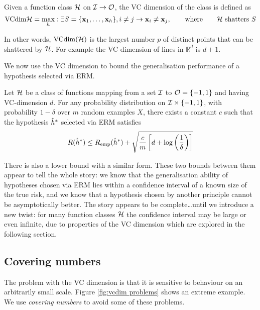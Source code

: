\begin{definition}[VC dimension]
\label{thm:vcdim bound}
Given a function class $\mathcal{H}$ on $\mathcal{I} \rightarrow \mathcal{O}$, the VC
dimension of the class is defined as
%
\begin{equation}
\mathrm{VCdim}{\mathcal{H}} = \max_{h} : \exists S = \{\mathbf{x}_1, \ldots, \mathbf{x}_h\},
i \neq j \rightarrow \mathbf{x}_i \neq \mathbf{x}_j,
\qquad \mbox{where} \qquad \mbox{\ensuremath{\mathcal{H}}\ shatters $S$}
\end{equation}
\end{definition}

In other words, $\mathrm{VCdim}(\mathcal{H})$ is the largest number $p$ of distinct
points that can be shattered by $\mathcal{H}$.  For example the VC dimension
of lines in $\mathbb{R}^d$ is $d+1$.

We now use the VC dimension to bound the generalisation performance of
a hypothesis selected via ERM.

\begin{theorem}
Let $\mathcal{H}$ be a class of functions mapping from a set $\mathcal{I}$ to $\mathcal{O} =
\{-1, 1\}$ and having VC-dimension $d$.  For any probability
distribution on $\mathcal{I} \times \{-1,1\}$, with probability $1-\delta$
over $m$ random examples $X$, there exists a constant $c$ such that
the hypothesis $\hat{h}^{\ast}$ selected via ERM satisfies
\begin{equation}
R(\hat{h}^{\ast}) \leq R_{\mathrm{emp}}(\hat{h}^{\ast}) + \sqrt{ \frac{c}{m} \left[ d
+ \log \left ( \frac{1}{\delta} \right) \right] }
\end{equation}
\end{theorem}

There is also a lower bound with a similar form.  These two bounds
between them appear to tell the whole story: we know that the
generalisation ability of hypotheses chosen via ERM lies within a
confidence interval of a known size of the true risk, and we know that
a hypothesis chosen by another principle cannot be asymptotically
better.  The story appears to be complete\ldots until we introduce a
new twist: for many function classes $\mathcal{H}$ the confidence interval
may be large or even infinite, due to properties of the VC dimension
which are explored in the following section. 

\subsection{Covering numbers}
\label{sec:covering numbers}

The problem with the VC dimension is that it is sensitive to behaviour
on an arbitrarily small scale.  Figure \ref{fig:vcdim problems} shows
an extreme example.  We use \emph{covering numbers} to avoid some of
these problems.

